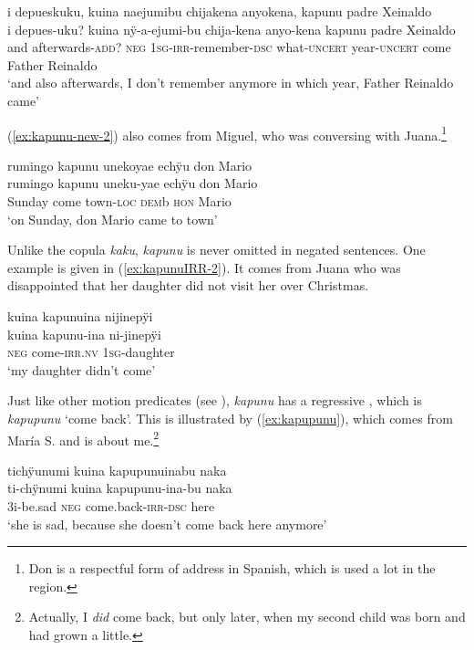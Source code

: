 \ea\label{ex:kapunu-4}
\begingl
\glpreamble i depueskuku, kuina naejumibu chijakena anyokena, kapunu padre Xeinaldo\\
\gla i depues-uku? kuina nÿ-a-ejumi-bu chija-kena anyo-kena kapunu {padre Xeinaldo}\\
\glb and afterwards-\textsc{add}? \textsc{neg} 1\textsc{sg}-\textsc{irr}-remember-\textsc{dsc} what-\textsc{uncert} year-\textsc{uncert} come {Father Reinaldo}\\
\glft ‘and also afterwards, I don’t remember anymore in which year, Father Reinaldo came’
\endgl
\trailingcitation{[mxx-p110825l.150-151]}
\xe

(\ref{ex:kapunu-new-2}) also comes from Miguel, who was conversing with Juana.\footnote{Don is a
respectful form of address in Spanish, which is used a lot in the region.}

\ea\label{ex:kapunu-new-2}
\begingl
\glpreamble rumingo kapunu unekoyae echÿu don Mario\\
\gla rumingo kapunu uneku-yae echÿu don Mario\\
\glb Sunday come town-\textsc{loc} \textsc{dem}b \textsc{hon} Mario\\
\glft ‘on Sunday, don Mario came to town’
\endgl
\trailingcitation{[jmx-c120429ls-x5.141]}
\xe

Unlike the copula \textit{kaku}, \textit{kapunu} is never omitted in negated sentences. One example is given in (\ref{ex:kapunuIRR-2}). It comes from Juana who was disappointed that her daughter did not visit her over Christmas.

\ea\label{ex:kapunuIRR-2}
\begingl 
\glpreamble kuina kapunuina nijinepÿi\\
\gla kuina kapunu-ina ni-jinepÿi\\ 
\glb \textsc{neg} come-\textsc{irr.nv} 1\textsc{sg}-daughter\\ 
\glft ‘my daughter didn’t come’\\ 
\endgl
\trailingcitation{[jxx-p120430l-1.317]}
\xe
{}

Just like other motion predicates (see ), \textit{kapunu} has a regressive , which is \textit{kapupunu} ‘come back’. This is illustrated by (\ref{ex:kapupunu}), which comes from María S. and is about me.\footnote{Actually, I \textit{did} come back, but only later, when my second child was born and had grown a little.} 

\ea\label{ex:kapupunu}
\begingl 
\glpreamble tichÿunumi kuina kapupunuinabu naka\\
\gla ti-chÿnumi kuina kapupunu-ina-bu naka\\ 
\glb 3i-be.sad \textsc{neg} come.back-\textsc{irr}-\textsc{dsc} here\\ 
\glft ‘she is sad, because she doesn’t come back here anymore’
\endgl
\trailingcitation{[rxx-e121128s-1.020]}
\xe
{}

